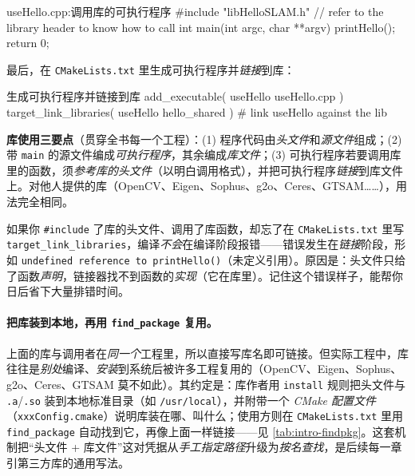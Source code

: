 \begin{codebox}[C++]{useHello.cpp:调用库的可执行程序}
#include "libHelloSLAM.h"   // refer to the library header to know how to call
int main(int argc, char **argv) {
    printHello();
    return 0;
}
\end{codebox}

\noindent 最后，在 \texttt{CMakeLists.\allowbreak txt} 里生成可执行程序并\emph{链接}到库：

\begin{codebox}[text]{生成可执行程序并链接到库}
add_executable( useHello useHello.cpp )
target_link_libraries( useHello hello_shared )   # link useHello against the lib
\end{codebox}

\begin{insight}
\textbf{库使用三要点}（贯穿全书每一个工程）：(1) 程序代码由\emph{头文件}和\emph{源文件}组成；(2) 带 \texttt{main} 的源文件编成\emph{可执行程序}，其余编成\emph{库文件}；(3) 可执行程序若要调用库里的函数，须\emph{参考库的头文件}（以明白调用格式），并把可执行程序\emph{链接}到库文件上\cite{gaoxiang2019slam14}。对他人提供的库（OpenCV、Eigen、Sophus、g2o、Ceres、GTSAM……），用法完全相同。
\end{insight}

\begin{pitfall}[陷阱：忘了链接库会怎样]
如果你 \texttt{\#include} 了库的头文件、调用了库函数，却忘了在 \texttt{CMakeLists.\allowbreak txt} 里写 \texttt{target\_link\_libraries}，编译\emph{不会}在编译阶段报错——错误发生在\emph{链接}阶段，形如 \texttt{undefined reference to printHello()}（未定义引用）。原因是：头文件只给了函数\emph{声明}，链接器找不到函数的\emph{实现}（它在库里）。记住这个错误样子，能帮你日后省下大量排错时间。
\end{pitfall}

\paragraph{把库装到本地，再用 \texttt{find\_package} 复用。}
上面的库与调用者在\emph{同一个}工程里，所以直接写库名即可链接。但实际工程中，库往往是\emph{别处}编译、\emph{安装}到系统后被许多工程复用的（OpenCV、Eigen、Sophus、g2o、Ceres、GTSAM 莫不如此）。其约定是：库作者用 \texttt{install} 规则把头文件与 \texttt{.a}/\allowbreak\texttt{.so} 装到本地标准目录（如 \texttt{/usr/local}），并附带一个 \emph{CMake 配置文件}（\texttt{xxxConfig.\allowbreak cmake}）说明库装在哪、叫什么；使用方则在 \texttt{CMakeLists.\allowbreak txt} 里用 \texttt{find\_package} 自动找到它，再像上面一样链接——见 \cref{tab:intro-findpkg}。这套机制把“头文件 + 库文件”这对凭据从\emph{手工指定路径}升级为\emph{按名查找}，是后续每一章引第三方库的通用写法。

